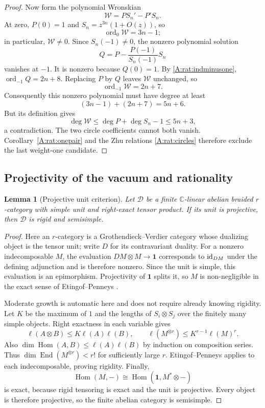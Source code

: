 \documentclass[11pt]{article}
\newtheorem{lemma}[theorem]{Lemma}
\newcommand{\C}{\mathbb C}\newcommand{\Q}{\mathbb Q}\newcommand{\Z}{\mathbb Z}
\newcommand{\one}{\mathbf1}\newcommand{\D}{\mathcal D}\newcommand{\Dcat}{\mathcal D}
\numberwithin{equation}{section}
\begin{document}
\begin{proof}
Now form the polynomial Wronskian
\[
 \mathscr W=P S_n'-P'S_n.
\]
At zero, $P(0)=1$ and $S_n=z^{3n}(1+O(z))$, so
\[
 \operatorname{ord}_0\mathscr W=3n-1;
\]
in particular, $\mathscr W\ne0$. Since $S_n(-1)\ne0$, the nonzero polynomial solution
\[
 Q=P-\frac{P(-1)}{S_n(-1)}S_n
\]
vanishes at $-1$. It is nonzero because $Q(0)=1$. By \eqref{A:rat:indminusone}, $\operatorname{ord}_{-1}Q=2n+8$. Replacing $P$ by $Q$ leaves $\mathscr W$ unchanged, so
\[
 \operatorname{ord}_{-1}\mathscr W=2n+7.
\]
Consequently this nonzero polynomial must have degree at least
\[
 (3n-1)+(2n+7)=5n+6.
\]
But its definition gives
\[
 \deg\mathscr W\leq\deg P+\deg S_n-1\leq5n+3,
\]
a contradiction. The two circle coefficients cannot both vanish. Corollary~\ref{A:rat:onepair} and the Zhu relations \eqref{A:rat:circles} therefore exclude the last weight-one candidate.
\end{proof}

\subsection{Projectivity of the vacuum and rationality}

\begin{lemma}[Projective unit criterion]\label{A:rat:projectiveunit}
Let $\mathcal D$ be a finite $\C$-linear abelian braided $r$-category with simple unit and right-exact tensor product. If its unit is projective, then $\mathcal D$ is rigid and semisimple.
\end{lemma}
\begin{proof}
Here an $r$-category is a Grothendieck--Verdier category whose dualizing object is the tensor unit; write $D$ for its contravariant duality. For a nonzero indecomposable $M$, the evaluation $DM\otimes M\to\one$ corresponds to $\operatorname{id}_{DM}$ under the defining adjunction and is therefore nonzero. Since the unit is simple, this evaluation is an epimorphism. Projectivity of $\one$ splits it, so $M$ is non-negligible in the exact sense of Etingof--Penneys \cite[Theorem 1.1]{A:EP}.

Moderate growth is automatic here and does not require already knowing rigidity. Let $K$ be the maximum of $1$ and the lengths of $S_i\otimes S_j$ over the finitely many simple objects. Right exactness in each variable gives
\[
 \ell(A\otimes B)\leq K\ell(A)\ell(B),\qquad
 \ell(M^{\otimes r})\leq K^{r-1}\ell(M)^r.
\]
Also $\dim\operatorname{Hom}(A,B)\leq\ell(A)\ell(B)$ by induction on composition series. Thus $\dim\operatorname{End}(M^{\otimes r})<r!$ for sufficiently large $r$. Etingof--Penneys applies to each indecomposable, proving rigidity. Finally,
\[
 \operatorname{Hom}(M,-)\cong
 \operatorname{Hom}(\one,M^*\otimes-)
\]
is exact, because rigid tensoring is exact and the unit is projective. Every object is therefore projective, so the finite abelian category is semisimple.
\end{proof}
\end{document}
